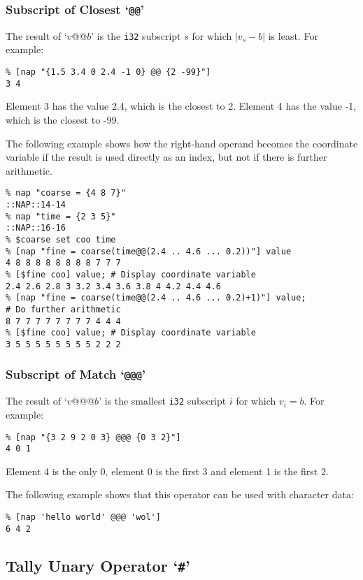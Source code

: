 \subsubsection{Subscript of Closest `\texttt{@@}'}
    \label{op-Subscript-of-Closest}
  
The result of 
`$v \texttt{@@} b$'
is the \texttt{i32} subscript $s$ for which 
$|v_s - b|$
is least.
For example:
  \begin{verbatim}
% [nap "{1.5 3.4 0 2.4 -1 0} @@ {2 -99}"]
3 4
\end{verbatim}

Element 3 has the value 2.4, which is the closest to 2. Element 4
has the value -1, which is the closest to -99.
  
 The following example shows how the right-hand operand becomes the
  coordinate variable if the result is used directly as an index, but
  not if there is further arithmetic.
  \begin{verbatim}
% nap "coarse = {4 8 7}"
::NAP::14-14
% nap "time = {2 3 5}"
::NAP::16-16
% $coarse set coo time
% [nap "fine = coarse(time@@(2.4 .. 4.6 ... 0.2))"] value
4 8 8 8 8 8 8 8 8 7 7 7
% [$fine coo] value; # Display coordinate variable
2.4 2.6 2.8 3 3.2 3.4 3.6 3.8 4 4.2 4.4 4.6
% [nap "fine = coarse(time@@(2.4 .. 4.6 ... 0.2)+1)"] value;
# Do further arithmetic
8 7 7 7 7 7 7 7 7 4 4 4
% [$fine coo] value; # Display coordinate variable
3 5 5 5 5 5 5 5 5 2 2 2
\end{verbatim}

\subsubsection{Subscript of Match `\texttt{@@@}'}
    \label{op-Subscript-of-Match}
  
The result of 
`$v \texttt{@@@} b$'
is the smallest \texttt{i32} subscript $i$ for which 
$v_i = b$.
For example:
  \begin{verbatim}
% [nap "{3 2 9 2 0 3} @@@ {0 3 2}"]
4 0 1
\end{verbatim}

  
 Element 4 is the only 0, element 0 is the first 3 and element 1 is
  the first 2.
  
 The following example shows that this operator can be used with
  character data:
  \begin{verbatim}
% [nap 'hello world' @@@ 'wol']
6 4 2
\end{verbatim}

\subsection{Tally Unary Operator `\texttt{\#}'}
    \label{op-Tally}
  
